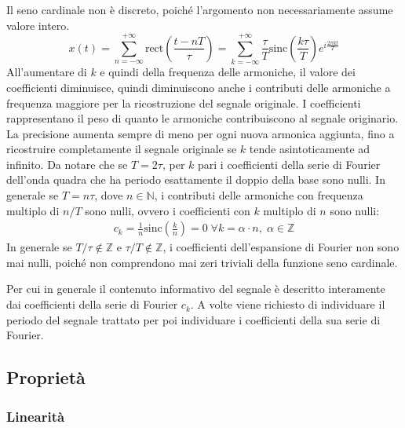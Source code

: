 \documentclass{article}
\newcommand{\rect}{\mathrm{rect}}
\newcommand{\sinc}{\mathrm{sinc}}
\numberwithin{equation}{subsection}
\begin{document}
Il seno cardinale non è discreto, poiché l'argomento non necessariamente assume valore intero. 
\begin{equation*}
    x(t)=\displaystyle\sum_{n=-\infty}^{+\infty}\rect\left(\frac{t-nT}{\tau}\right)=\sum_{k=-\infty}^{+\infty}\frac{\tau}{T}\sinc\left(\frac{k \tau}{T}\right)e^{i\frac{2\pi kt}{T}}
\end{equation*}
All'aumentare di $k$ e quindi della frequenza delle armoniche, il valore dei coefficienti diminuisce, quindi diminuiscono anche i contributi delle armoniche a frequenza 
maggiore per la ricostruzione del segnale originale. I coefficienti rappresentano il peso di quanto le armoniche contribuiscono al segnale originario. La precisione 
aumenta sempre di meno per ogni nuova armonica aggiunta, fino a ricostruire completamente il segnale originale se $k$ tende asintoticamente ad infinito. Da notare che se 
$T=2\tau$, per $k$ pari i coefficienti della serie di Fourier dell'onda quadra che ha periodo esattamente il doppio della base sono nulli. In generale se $T=n\tau$, dove 
$n\in\mathbb{N}$, i contributi delle armoniche con frequenza multiplo di $n/T$ sono nulli, ovvero i coefficienti con $k$ multiplo di $n$ sono nulli:
\begin{gather*}
    c_k=\frac{1}{n}\sinc\left(\frac{k}{n}\right)=0\;\forall k=\alpha\cdot n,\;\alpha\in\mathbb{Z}
\end{gather*}
In generale se $T/\tau\notin\mathbb{Z}$ e $\tau/T\notin\mathbb{Z}$, i coefficienti dell'espansione di Fourier non sono mai nulli, poiché non comprendono mai zeri triviali 
della funzione seno cardinale. 



Per cui in generale il contenuto informativo del segnale è descritto interamente dai coefficienti della serie di Fourier $c_k$. 
A volte viene richiesto di individuare il periodo del segnale trattato per poi individuare i coefficienti della sua serie di Fourier.

\subsection{Proprietà}

\subsubsection{Linearità}
\end{document}
